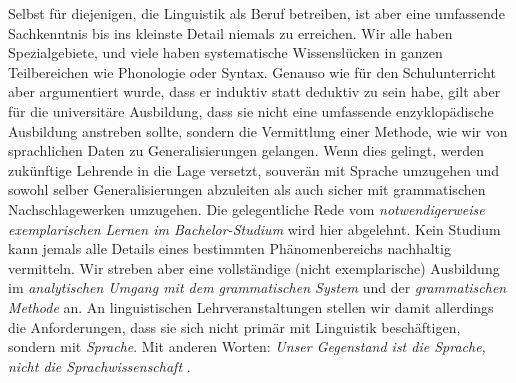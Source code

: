 Selbst für diejenigen, die Linguistik als Beruf betreiben, ist aber eine umfassende Sachkenntnis bis ins kleinste Detail niemals zu erreichen.
Wir alle haben Spezialgebiete, und viele haben systematische Wissenslücken in ganzen Teilbereichen wie Phonologie oder Syntax.
Genauso wie für den Schulunterricht aber argumentiert wurde, dass er induktiv statt deduktiv zu sein habe, gilt aber für die universitäre Ausbildung, dass sie nicht eine umfassende enzyklopädische Ausbildung anstreben sollte, sondern die Vermittlung einer Methode, wie wir von sprachlichen Daten zu Generalisierungen gelangen.
Wenn dies gelingt, werden zukünftige Lehrende in die Lage versetzt, souverän mit Sprache umzugehen und sowohl selber Generalisierungen abzuleiten als auch sicher mit grammatischen Nachschlagewerken umzugehen.
Die gelegentliche Rede vom \textit{notwendigerweise exemplarischen Lernen im Bachelor-Studium} wird hier abgelehnt.
Kein Studium kann jemals alle Details eines bestimmten Phänomenbereichs nachhaltig vermitteln.
Wir streben aber eine vollständige (nicht exemplarische) Ausbildung im \textit{analytischen Umgang mit dem grammatischen System} und der \textit{grammatischen Methode} an.
An linguistischen Lehrveranstaltungen stellen wir damit allerdings die Anforderungen, dass sie sich nicht primär mit Linguistik beschäftigen, sondern mit \textit{Sprache}.
Mit anderen Worten:
\textit{Unser Gegenstand ist die Sprache, nicht die Sprachwissenschaft} \citep[22]{Eisenberg2004}.

